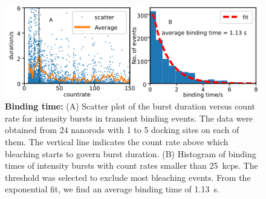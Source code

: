 \begin{figure}[ht]
	\centering
	\includegraphics[width=\textwidth]{countrate_vs_duration_nophtns}
	\caption{\textbf{Binding time:} (A) Scatter plot of the burst duration versus count rate for intensity bursts in transient binding events. The data were obtained from $24$ nanorods with 1 to 5 docking sites on each of them. The vertical line indicates the count rate above which bleaching starts to govern burst duration.
	(B) Histogram of binding times of intensity bursts with count rates smaller than \SI{25}{ kcps}. The threshold was selected to exclude most bleaching events. From the exponential fit, we find an average binding time of \SI{1.13}{\s}.}
  	\label{fig:countrate_vs_duration}
\end{figure}



